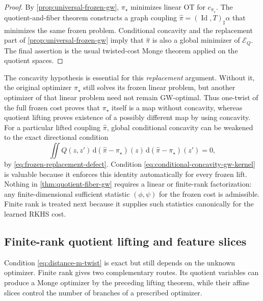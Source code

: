 \documentclass[11pt,a4paper]{article}
\theoremstyle{definition}
\theoremstyle{remark}
\newcommand{\Ecal}{\mathcal E}
\newcommand{\Id}{\operatorname{Id}}
\newcommand{\dd}{\,\mathrm d}
\begin{document}
\begin{proof}
By \cref{prop:universal-frozen-gw}, \(\pi_\star\) minimizes linear OT for
\(c_{\pi_\star}\).  The quotient-and-fiber theorem constructs a graph
coupling \(\widehat\pi=(\Id,T)_\sharp\alpha\) that minimizes the same frozen
problem.  Conditional concavity and the replacement part of
\cref{prop:universal-frozen-gw} imply that \(\widehat\pi\) is also a global
minimizer of \(\Ecal_Q\).  The final assertion is the usual twisted-cost
Monge theorem applied on the quotient spaces.
\end{proof}

The concavity hypothesis is essential for this \emph{replacement} argument.
Without it, the original optimizer \(\pi_\star\) still solves its frozen
linear problem, but another optimizer of that linear problem need not remain
GW-optimal.  Thus one-twist of the full frozen cost proves that
\(\pi_\star\) itself is a map without concavity, whereas quotient lifting
proves existence of a possibly different map by using concavity.
For a particular lifted coupling \(\widehat\pi\), global conditional
concavity can be weakened to the exact directional condition
\begin{equation}
  \iint Q(z,z')
  \dd(\widehat\pi-\pi_\star)(z)
  \dd(\widehat\pi-\pi_\star)(z')=0,
  \label{eq:directional-quotient-replacement}
\end{equation}
by \eqref{eq:frozen-replacement-defect}.  Condition
\eqref{eq:conditional-concavity-gw-kernel} is valuable because it enforces
this identity automatically for every frozen lift.
Nothing in \cref{thm:quotient-fiber-gw} requires a linear or finite-rank
factorization: any finite-dimensional sufficient statistic
\((\phi,\psi)\) for the frozen cost is admissible.  Finite rank is treated
next because it supplies such statistics canonically for the learned RKHS
cost.

\subsection{Finite-rank quotient lifting and feature slices}

Condition \eqref{eq:distance-m-twist} is exact but still depends on the
unknown optimizer.  Finite rank gives two complementary routes.  Its
quotient variables can produce a Monge optimizer by the preceding lifting
theorem, while their affine slices control the number of branches of a
prescribed optimizer.
\end{document}
